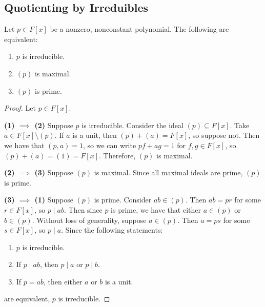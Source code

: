 \documentclass [12pt] {article}
\newenvironment{theorem}[1]{\begin{tcolorbox}[title={Theorem #1},colback=green!5!white,colframe=black!75!green]}{\end{tcolorbox}}
\renewcommand{\bf}[1]{\textbf{{#1}}}
\begin{document}
\newpage
\subsection{Quotienting by Irreduibles}
\begin{theorem}{}
    Let $p \in F[x]$ be a nonzero, nonconstant polynomial. The following are equivalent:
    \begin{enumerate}[label=(\arabic*)]
        \item $p$ is irreducible.
        \item $(p)$ is maximal.
        \item $(p)$ is prime.
    \end{enumerate}
\end{theorem}
\begin{proof}
    Let $p \in F[x]$.
    \vspace{0.5em}

    \bf{(1) $\bm{\implies}$ (2)}
    Suppose $p$ is irreducible. Consider the ideal $(p) \subseteq F[x]$. Take
    $a \in F[x] \setminus (p)$. If $a$ is a unit, then $(p) + (a) = F[x]$, so suppose not. Then we
    have that $(p, a) = 1$, so we can write $pf + ag = 1$ for $f, g \in F[x]$, so
    $(p) + (a) = (1) = F[x]$. Therefore, $(p)$ is maximal.
    \vspace{0.5em}

    \bf{(2) $\bm{\implies}$ (3)}
    Suppose $(p)$ is maximal. Since all maximal ideals are prime, $(p)$ is prime.
    \vspace{0.5em}

    \bf{(3) $\bm{\implies}$ (1)}
    Suppose $(p)$ is prime. Consider $ab \in (p)$. Then $ab = pr$ for some $r \in F[x]$, so
    $p \mid ab$. Then since $p$ is prime, we have that either $a \in (p)$ or $b \in (p)$. Without
    loss of generality, suppose $a \in (p)$. Then $a = ps$ for some $s \in F[x]$, so $p \mid a$.
    Since the following statements:
    \begin{enumerate}[label=(\arabic*)]
        \item $p$ is irreducible.
        \item If $p \mid ab$, then $p \mid a$ or $p \mid b$.
        \item If $p = ab$, then either $a$ or $b$ is a unit.
    \end{enumerate}
    are equivalent, $p$ is irreducible.
\end{proof}
\end{document}
